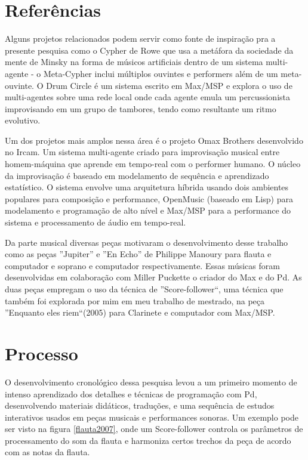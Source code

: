 \documentclass{ppgmus}
\begin{document}
\section{Referências}

Alguns projetos relacionados podem servir como fonte de inspiração pra
a presente pesquisa como o Cypher \cite{rowe93:interactive}   de Rowe que usa a metáfora da
sociedade da mente de Minsky na forma de músicos artificiais dentro de
um sistema multi-agente - o Meta-Cypher inclui múltiplos ouvintes e
performers além de um meta-ouvinte.  O Drum Circle \cite{eigenfeld07:drum} é um sistema escrito em Max/MSP e explora o uso de
multi-agentes sobre uma rede local onde cada agente emula um
percussionista improvisando em um grupo de tambores, tendo como
resultante um ritmo evolutivo.

Um dos projetos mais amplos nessa área é o projeto Omax Brothers \cite{assayag06:omax}
desenvolvido no Ircam. Um sistema multi-agente criado para
improvisação musical entre homem-máquina que aprende em tempo-real com
o performer humano. O núcleo da improvisação é baseado em modelamento
de sequência e aprendizado estatístico. O sistema envolve uma
arquitetura híbrida usando dois ambientes populares para composição e
performance, OpenMusic (baseado em Lisp) para modelamento e
programação de alto nível e Max/MSP para a performance do sistema e
processamento de áudio em tempo-real.

Da parte musical diversas peças motivaram o desenvolvimento desse trabalho como as peças
''Jupiter'' e ''En Echo'' de Philippe Manoury para flauta e computador e soprano e computador respectivamente.
Essas músicas foram desenvolvidas em colaboração com Miller Puckette o criador do Max e do Pd. As duas 
peças empregam o uso da técnica de ''Score-follower``, uma técnica que também foi explorada por mim em
meu trabalho de mestrado, na peça ''Enquanto eles riem``(2005) para Clarinete e computador com Max/MSP.

\section{Processo}

O desenvolvimento cronológico dessa pesquisa levou a um primeiro momento de intenso aprendizado
dos detalhes e técnicas de programação com Pd, desenvolvendo materiais didáticos, traduções, e uma
sequência de estudos interativos usados em peças musicais e performances sonoras. Um exemplo pode ser visto
na figura \ref{flauta2007}, onde um Score-follower controla os parâmetros de 
processamento do som da flauta e harmoniza certos trechos da peça de acordo com as notas da flauta.
\end{document}
